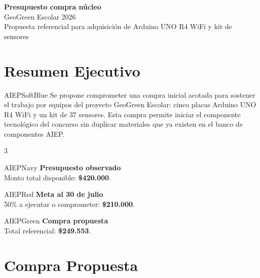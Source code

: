 \documentclass[10pt,letterpaper]{article}
\newcommand{\money}[1]{\textbf{\$#1}}
\begin{document}
\begin{tcolorbox}[
  enhanced,
  colback=AIEPNavy,
  colframe=AIEPNavy,
  arc=0mm,
  boxrule=0pt,
  left=5mm,
  right=5mm,
  top=5mm,
  bottom=5mm
]
{\color{white}\Huge\bfseries Presupuesto compra núcleo}\\[2mm]
{\color{white}\Large GeoGreen Escolar 2026}\\[3mm]
{\color{AIEPSoftBlue} Propuesta referencial para adquisición de Arduino UNO R4 WiFi y kit de sensores}
\end{tcolorbox}

\section{Resumen Ejecutivo}

\begin{infobox}{AIEPSoftBlue}
Se propone comprometer una compra inicial acotada para sostener el trabajo por equipos del proyecto GeoGreen Escolar: cinco placas Arduino UNO R4 WiFi y un kit de 37 sensores. Esta compra permite iniciar el componente tecnológico del concurso sin duplicar materiales que ya existen en el banco de componentes AIEP.
\end{infobox}

\begin{multicols}{3}
\begin{infobox}{AIEPNavy}
\textbf{Presupuesto observado}\\
Monto total disponible: \money{420.000}.
\end{infobox}

\begin{infobox}{AIEPRed}
\textbf{Meta al 30 de julio}\\
50\% a ejecutar o comprometer: \money{210.000}.
\end{infobox}

\begin{infobox}{AIEPGreen}
\textbf{Compra propuesta}\\
Total referencial: \money{249.553}.
\end{infobox}
\end{multicols}

\section{Compra Propuesta}
\end{document}
